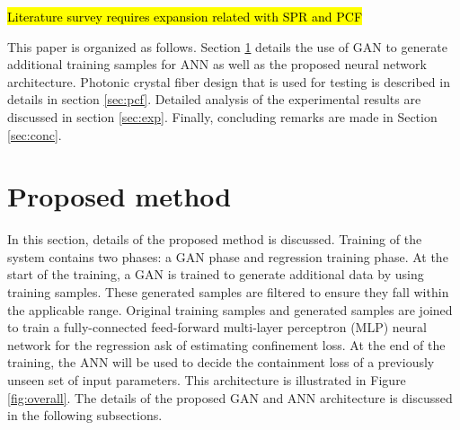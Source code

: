 \documentclass[10pt]{IEEEtran}
\begin{document}
\hl{Literature survey requires expansion related with SPR and PCF}

This paper is organized as follows. Section \ref{sec:prop} details the use of GAN to generate additional training samples for ANN as well as the proposed neural network architecture. Photonic crystal fiber design that is used for testing is described in details in section \ref{sec:pcf}. Detailed analysis of the experimental results are discussed in section \ref{sec:exp}. Finally, concluding remarks are made in Section \ref{sec:conc}.

\section{Proposed method}
\label{sec:prop}

In this section, details of the proposed method is discussed. Training of the system contains two phases: a GAN phase and regression training phase. At the start of the training, a GAN is trained to generate additional data by using training samples. These generated samples are filtered to ensure they fall within the applicable range. Original training samples and generated samples are joined to train a fully-connected feed-forward multi-layer perceptron (MLP) neural network for the regression ask of estimating confinement loss. At the end of the training, the ANN will be used to decide the containment loss of a previously unseen set of input parameters. This architecture is illustrated in Figure \ref{fig:overall}. The details of the proposed GAN and ANN architecture is discussed in the following subsections.
\end{document}

